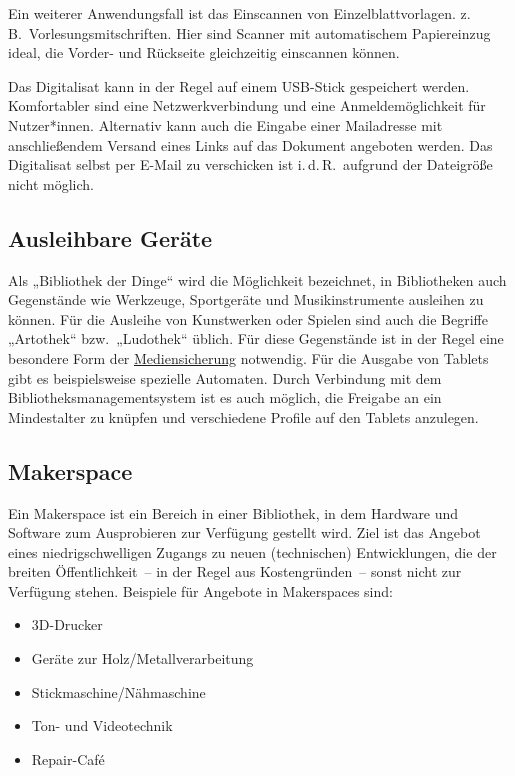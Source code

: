 \documentclass[
  11pt,
  letterpaper,
  DIV=11,
  twoside]{scrreprt}
\begin{document}
Ein weiterer Anwendungsfall ist das Einscannen von Einzelblattvorlagen.
z.\,B.~Vorlesungsmitschriften. Hier sind Scanner mit automatischem
Papiereinzug ideal, die Vorder- und Rückseite gleichzeitig einscannen
können.

Das Digitalisat kann in der Regel auf einem USB-Stick gespeichert
werden. Komfortabler sind eine Netzwerkverbindung und eine
Anmeldemöglichkeit für Nutzer*innen. Alternativ kann auch die Eingabe
einer Mailadresse mit anschließendem Versand eines Links auf das
Dokument angeboten werden. Das Digitalisat selbst per E-Mail zu
verschicken ist i.\,d.\,R.~aufgrund der Dateigröße nicht möglich.

\subsection{Ausleihbare Geräte}\label{ausleihbare-geruxe4te}

Als „Bibliothek der Dinge`` wird die Möglichkeit bezeichnet, in
Bibliotheken auch Gegenstände wie Werkzeuge, Sportgeräte und
Musikinstrumente ausleihen zu können. Für die Ausleihe von Kunstwerken
oder Spielen sind auch die Begriffe „Artothek`` bzw.~„Ludothek`` üblich.
Für diese Gegenstände ist in der Regel eine besondere Form der
\hyperref[mediensicherung]{Mediensicherung} notwendig. Für die Ausgabe
von Tablets gibt es beispielsweise spezielle Automaten. Durch Verbindung
mit dem Bibliotheksmanagementsystem ist es auch möglich, die Freigabe an
ein Mindestalter zu knüpfen und verschiedene Profile auf den Tablets
anzulegen.

\subsection{Makerspace}\label{makerspace}

Ein Makerspace ist ein Bereich in einer Bibliothek, in dem Hardware und
Software zum Ausprobieren zur Verfügung gestellt wird. Ziel ist das
Angebot eines niedrigschwelligen Zugangs zu neuen (technischen)
Entwicklungen, die der breiten Öffentlichkeit~-- in der Regel aus
Kostengründen~-- sonst nicht zur Verfügung stehen. Beispiele für
Angebote in Makerspaces sind:

\begin{itemize}
\item
  3D-Drucker
\item
  Geräte zur Holz/Metallverarbeitung
\item
  Stickmaschine/Nähmaschine
\item
  Ton- und Videotechnik
\item
  Repair-Café
\end{itemize}
\end{document}

